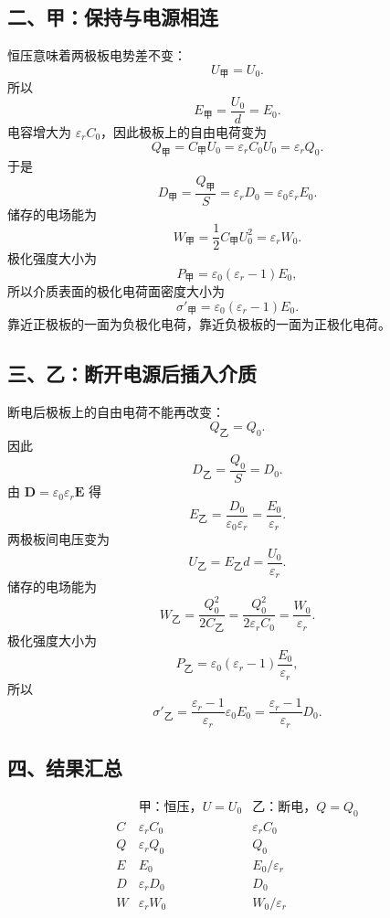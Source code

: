 \documentclass[11pt,a4paper]{ctexart}
\begin{document}
\subsection*{二、甲：保持与电源相连}

恒压意味着两极板电势差不变：
\[
  U_{\text{甲}}=U_0.
\]
所以
\[
  E_{\text{甲}}=\frac{U_0}{d}=E_0.
\]
电容增大为 $\varepsilon_rC_0$，因此极板上的自由电荷变为
\[
  Q_{\text{甲}}=C_{\text{甲}}U_0
  =\varepsilon_r C_0U_0
  =\varepsilon_r Q_0.
\]
于是
\[
  D_{\text{甲}}=\frac{Q_{\text{甲}}}{S}
  =\varepsilon_rD_0
  =\varepsilon_0\varepsilon_rE_0.
\]
储存的电场能为
\[
  W_{\text{甲}}
  =\frac12 C_{\text{甲}}U_0^2
  =\varepsilon_rW_0.
\]
极化强度大小为
\[
  P_{\text{甲}}
  =\varepsilon_0(\varepsilon_r-1)E_0,
\]
所以介质表面的极化电荷面密度大小为
\[
  \boxed{\sigma'_{\text{甲}}=\varepsilon_0(\varepsilon_r-1)E_0.}
\]
靠近正极板的一面为负极化电荷，靠近负极板的一面为正极化电荷。

\subsection*{三、乙：断开电源后插入介质}

断电后极板上的自由电荷不能再改变：
\[
  Q_{\text{乙}}=Q_0.
\]
因此
\[
  D_{\text{乙}}=\frac{Q_0}{S}=D_0.
\]
由 $\bm D=\varepsilon_0\varepsilon_r\bm E$ 得
\[
  E_{\text{乙}}
  =\frac{D_0}{\varepsilon_0\varepsilon_r}
  =\frac{E_0}{\varepsilon_r}.
\]
两极板间电压变为
\[
  U_{\text{乙}}=E_{\text{乙}}d
  =\frac{U_0}{\varepsilon_r}.
\]
储存的电场能为
\[
  W_{\text{乙}}
  =\frac{Q_0^2}{2C_{\text{乙}}}
  =\frac{Q_0^2}{2\varepsilon_rC_0}
  =\frac{W_0}{\varepsilon_r}.
\]
极化强度大小为
\[
  P_{\text{乙}}
  =\varepsilon_0(\varepsilon_r-1)\frac{E_0}{\varepsilon_r},
\]
所以
\[
  \boxed{\sigma'_{\text{乙}}
  =\frac{\varepsilon_r-1}{\varepsilon_r}\varepsilon_0E_0
  =\frac{\varepsilon_r-1}{\varepsilon_r}D_0.}
\]

\subsection*{四、结果汇总}

\[
\begin{array}{c|c|c}
 & \text{甲：恒压，}U=U_0 & \text{乙：断电，}Q=Q_0\\
\hline
C & \varepsilon_rC_0 & \varepsilon_rC_0\\
Q & \varepsilon_rQ_0 & Q_0\\
E & E_0 & E_0/\varepsilon_r\\
D & \varepsilon_rD_0 & D_0\\
W & \varepsilon_rW_0 & W_0/\varepsilon_r
\end{array}
\]
\end{document}
